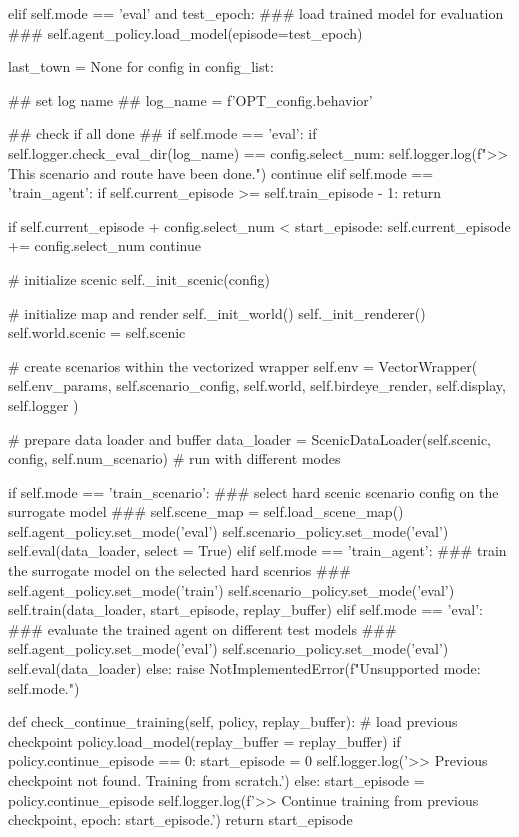 \begin{appendix}
elif self.mode == 'eval' and test\_epoch:
\#\#\# load trained model for evaluation \#\#\#
self.agent\_policy.load\_model(episode=test\_epoch)

last\_town = None
for config in config\_list:

\#\# set log name \#\#
log\_name = f'OPT\_{config.behavior}'

\#\# check if all done \#\#
if self.mode == 'eval':
if self.logger.check\_eval\_dir(log\_name) == config.select\_num:
self.logger.log(f">> This scenario and route have been done.")
continue
elif self.mode == 'train\_agent': 
if self.current\_episode >= self.train\_episode - 1:
return

if self.current\_episode + config.select\_num < start\_episode:
self.current\_episode += config.select\_num
continue

\# initialize scenic
self.\_init\_scenic(config)

\# initialize map and render
self.\_init\_world()
self.\_init\_renderer()
self.world.scenic = self.scenic

\# create scenarios within the vectorized wrapper
self.env = VectorWrapper(
self.env\_params, 
self.scenario\_config, 
self.world, 
self.birdeye\_render, 
self.display, 
self.logger
)

\# prepare data loader and buffer
data\_loader = ScenicDataLoader(self.scenic, config, self.num\_scenario)
\# run with different modes

if self.mode == 'train\_scenario':
\#\#\# select hard scenic scenario config on the surrogate model \#\#\#
self.scene\_map = self.load\_scene\_map()
self.agent\_policy.set\_mode('eval')
self.scenario\_policy.set\_mode('eval')
self.eval(data\_loader, select = True)
elif self.mode == 'train\_agent':
\#\#\# train the surrogate model on the selected hard scenrios \#\#\#
self.agent\_policy.set\_mode('train')
self.scenario\_policy.set\_mode('eval')
self.train(data\_loader, start\_episode, replay\_buffer)
elif self.mode == 'eval':
\#\#\# evaluate the trained agent on different test models \#\#\#
self.agent\_policy.set\_mode('eval')
self.scenario\_policy.set\_mode('eval')
self.eval(data\_loader)
else:
raise NotImplementedError(f"Unsupported mode: {self.mode}.")

def check\_continue\_training(self, policy, replay\_buffer):
\# load previous checkpoint
policy.load\_model(replay\_buffer = replay\_buffer)
if policy.continue\_episode == 0:
start\_episode = 0
self.logger.log('>> Previous checkpoint not found. Training from scratch.')
else:
start\_episode = policy.continue\_episode
self.logger.log(f'>> Continue training from previous checkpoint, epoch: {start\_episode}.')
return start\_episode


\end{appendix}
